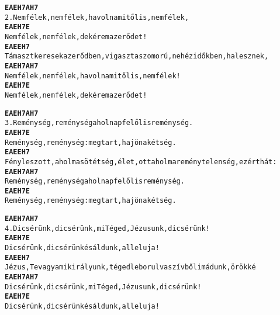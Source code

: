 \cleardoublepage
{}
\kottastart
{}
\kottaend
\begin{minipage}{\textwidth}
\begin{alltt}
\textbf{    E          A             E     H7        A     H7}
2. Nem félek, nem félek, ha volna mitől is, nem félek,
\textbf{    E          A             E    H7     E}
   Nem félek, nem félek, de kérem az erődet!
\textbf{    E                 A    E    E                            H7}
   Támaszt keresek az erődben, vigaszt a szomorú, nehéz időkben, ha lesznek,
\textbf{    E          A             E     H7        A     H7}
   Nem félek, nem félek, ha volna mitől is, nem félek!
\textbf{    E          A             E    H7     E}
   Nem félek, nem félek, de kérem az erődet!
\end{alltt}
\vspace{0.0cm}
\versszakspacing
\end{minipage}
\begin{minipage}{\textwidth}
\begin{alltt}
\textbf{    E          A           E      H7       A     H7}
3. Reménység, reménység a holnap felől is reménység.
\textbf{    E          A             E        H7       E}
   Reménység, reménység: megtart, ha jön a kétség.
\textbf{    E                      A    E   E                             H7}
   Fény lesz ott, ahol ma sötétség, élet, ott ahol ma reménytelenség, ezért hát:
\textbf{    E          A           E      H7       A     H7}
   Reménység, reménység a holnap felől is reménység.
\textbf{    E          A             E        H7       E}
   Reménység, reménység: megtart, ha jön a kétség.
\end{alltt}
\vspace{0.0cm}
\versszakspacing
\end{minipage}
\begin{minipage}{\textwidth}
\begin{alltt}
\textbf{    E          A             E      H7        A    H7}
4. Dicsérünk, dicsérünk, mi Téged, Jézusunk, dicsérünk!
\textbf{    E          A           E       H7     E}
   Dicsérünk, dicsérünk és áldunk, alleluja!
\textbf{    E                   A    E     E                          H7}
   Jézus, Te vagy a mi királyunk, téged leborulva szívből imádunk, örökké
\textbf{    E          A             E      H7        A    H7}
   Dicsérünk, dicsérünk, mi Téged, Jézusunk, dicsérünk!
\textbf{    E          A           E       H7     E}
   Dicsérünk, dicsérünk és áldunk, alleluja!
\end{alltt}
\vspace{0.0cm}
\versszakspacing
\end{minipage}
~\vspace{1.0cm}
\newline
